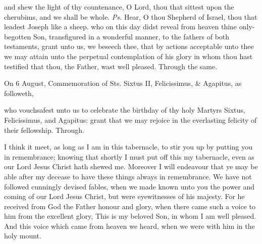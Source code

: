 \introit
{} and shew the light of thy countenance, O Lord, thou that sittest upon the cherubims, and we shall be whole. \textit{Ps.} Hear, O thou Shepherd of Israel, thou that leadest Joseph like a sheep.
\collect
 who on this day didst reveal from heaven thine only-begotten Son, transfigured in a wonderful manner, to the fathers of both testaments, grant unto us, we beseech thee, that by actions acceptable unto thee we may attain unto the perpetual contemplation of his glory in whom thou hast testified that thou, the Father, wast well pleased. Through the same.
\begin{rubric}
	 On 6 August, Commemoration of Sts. Sixtus II, Felicissimus, \& Agapitus, as followeth,
\end{rubric}
 who vouchsafest unto us to celebrate the birthday of thy holy Martyrs Sixtus, Felicissimus, and Agapitus: grant that we may rejoice in the everlasting felicity of their fellowship. Through.

 I think it meet, as long as I am in this tabernacle, to stir you up by putting you in remembrance; knowing that shortly I must put off this my tabernacle, even as our Lord Jesus Christ hath shewed me. Moreover I will endeavour that ye may be able after my decease to have these things always in remembrance. We have not followed cunningly devised fables, when we made known unto you the power and coming of our Lord Jesus Christ, but were eyewitnesses of his majesty. For he received from God the Father honour and glory, when there came such a voice to him from the excellent glory, This is my beloved Son, in whom I am well pleased. And this voice which came from heaven we heard, when we were with him in the holy mount.


